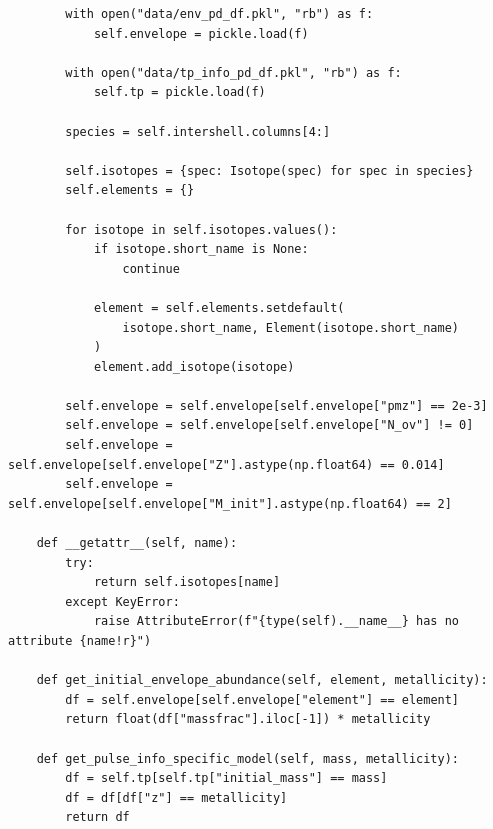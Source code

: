 \documentclass[a4paper,10pt]{article}
\begin{document}
\begin{verbatim}
        with open("data/env_pd_df.pkl", "rb") as f:
            self.envelope = pickle.load(f)

        with open("data/tp_info_pd_df.pkl", "rb") as f:
            self.tp = pickle.load(f)

        species = self.intershell.columns[4:]

        self.isotopes = {spec: Isotope(spec) for spec in species}
        self.elements = {}

        for isotope in self.isotopes.values():
            if isotope.short_name is None:
                continue

            element = self.elements.setdefault(
                isotope.short_name, Element(isotope.short_name)
            )
            element.add_isotope(isotope)

        self.envelope = self.envelope[self.envelope["pmz"] == 2e-3]
        self.envelope = self.envelope[self.envelope["N_ov"] != 0]
        self.envelope = self.envelope[self.envelope["Z"].astype(np.float64) == 0.014]
        self.envelope = self.envelope[self.envelope["M_init"].astype(np.float64) == 2]

    def __getattr__(self, name):
        try:
            return self.isotopes[name]
        except KeyError:
            raise AttributeError(f"{type(self).__name__} has no attribute {name!r}")

    def get_initial_envelope_abundance(self, element, metallicity):
        df = self.envelope[self.envelope["element"] == element]
        return float(df["massfrac"].iloc[-1]) * metallicity

    def get_pulse_info_specific_model(self, mass, metallicity):
        df = self.tp[self.tp["initial_mass"] == mass]
        df = df[df["z"] == metallicity]
        return df
\end{verbatim}
\end{document}
